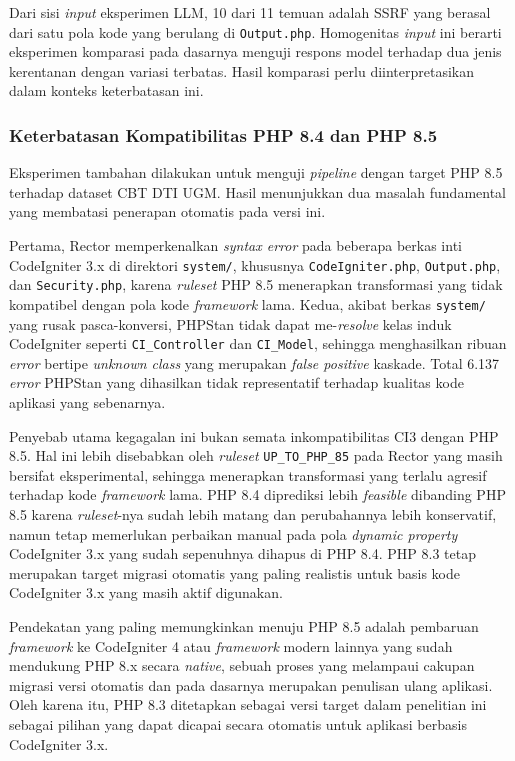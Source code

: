 Dari sisi \textit{input} eksperimen LLM, 10 dari 11 temuan adalah SSRF yang berasal dari satu pola kode yang berulang di \texttt{Output.php}. Homogenitas \textit{input} ini berarti eksperimen komparasi pada dasarnya menguji respons model terhadap dua jenis kerentanan dengan variasi terbatas. Hasil komparasi perlu diinterpretasikan dalam konteks keterbatasan ini.

\subsubsection{Keterbatasan Kompatibilitas PHP 8.4 dan PHP 8.5}

Eksperimen tambahan dilakukan untuk menguji \textit{pipeline} dengan 
target PHP 8.5 terhadap dataset CBT DTI UGM. Hasil menunjukkan dua 
masalah fundamental yang membatasi penerapan otomatis pada versi ini.

Pertama, Rector memperkenalkan \textit{syntax error} pada beberapa 
berkas inti CodeIgniter 3.x di direktori \texttt{system/}, khususnya 
\texttt{CodeIgniter.php}, \texttt{Output.php}, dan 
\texttt{Security.php}, karena \textit{ruleset} PHP 8.5 menerapkan 
transformasi yang tidak kompatibel dengan pola kode \textit{framework} 
lama. Kedua, akibat berkas \texttt{system/} yang rusak pasca-konversi, 
PHPStan tidak dapat me-\textit{resolve} kelas induk CodeIgniter seperti 
\texttt{CI\_Controller} dan \texttt{CI\_Model}, sehingga menghasilkan 
ribuan \textit{error} bertipe \textit{unknown class} yang merupakan 
\textit{false positive} kaskade. Total 6.137 \textit{error} PHPStan 
yang dihasilkan tidak representatif terhadap kualitas kode aplikasi 
yang sebenarnya.

Penyebab utama kegagalan ini bukan semata inkompatibilitas CI3 dengan 
PHP 8.5. Hal ini lebih disebabkan oleh \textit{ruleset} 
\texttt{UP\_TO\_PHP\_85} pada Rector yang masih bersifat eksperimental, 
sehingga menerapkan transformasi yang terlalu agresif terhadap kode 
\textit{framework} lama. 
PHP 8.4 diprediksi lebih \textit{feasible} dibanding PHP 8.5 karena 
\textit{ruleset}-nya sudah lebih matang dan perubahannya lebih 
konservatif, namun tetap memerlukan perbaikan manual pada pola 
\textit{dynamic property} CodeIgniter 3.x yang sudah sepenuhnya 
dihapus di PHP 8.4. PHP 8.3 tetap merupakan target migrasi otomatis 
yang paling realistis untuk basis kode CodeIgniter 3.x yang masih 
aktif digunakan.

Pendekatan yang paling memungkinkan menuju PHP 8.5 adalah pembaruan \textit{framework} 
ke CodeIgniter 4 atau \textit{framework} modern lainnya yang sudah 
mendukung PHP 8.x secara \textit{native}, sebuah proses yang melampaui 
cakupan migrasi versi otomatis dan pada dasarnya merupakan penulisan 
ulang aplikasi. Oleh karena itu, PHP 8.3 ditetapkan sebagai versi 
target dalam penelitian ini sebagai pilihan yang dapat dicapai secara 
otomatis untuk aplikasi berbasis CodeIgniter 3.x.

